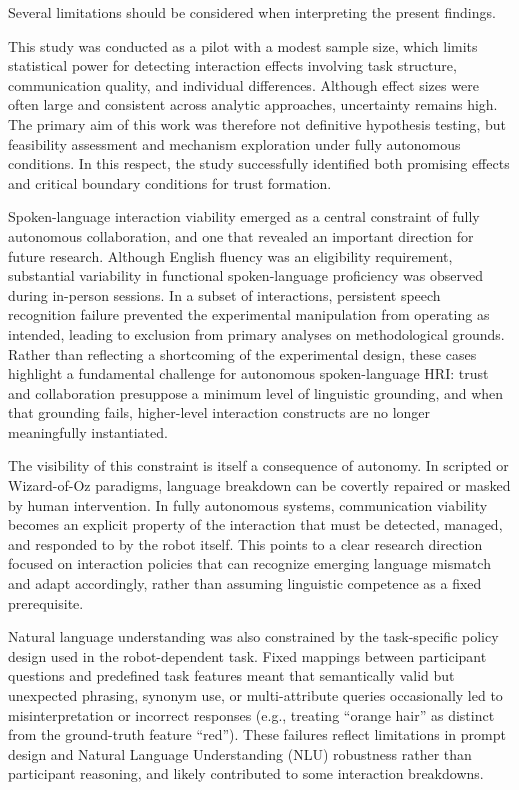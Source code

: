 \documentclass[
  letterpaper,
  DIV=11,
  numbers=noendperiod]{scrartcl}
\begin{document}
Several limitations should be considered when interpreting the present
findings.

This study was conducted as a pilot with a modest sample size, which
limits statistical power for detecting interaction effects involving
task structure, communication quality, and individual differences.
Although effect sizes were often large and consistent across analytic
approaches, uncertainty remains high. The primary aim of this work was
therefore not definitive hypothesis testing, but feasibility assessment
and mechanism exploration under fully autonomous conditions. In this
respect, the study successfully identified both promising effects and
critical boundary conditions for trust formation.

Spoken-language interaction viability emerged as a central constraint of
fully autonomous collaboration, and one that revealed an important
direction for future research. Although English fluency was an
eligibility requirement, substantial variability in functional
spoken-language proficiency was observed during in-person sessions. In a
subset of interactions, persistent speech recognition failure prevented
the experimental manipulation from operating as intended, leading to
exclusion from primary analyses on methodological grounds. Rather than
reflecting a shortcoming of the experimental design, these cases
highlight a fundamental challenge for autonomous spoken-language HRI:
trust and collaboration presuppose a minimum level of linguistic
grounding, and when that grounding fails, higher-level interaction
constructs are no longer meaningfully instantiated.

The visibility of this constraint is itself a consequence of autonomy.
In scripted or Wizard-of-Oz paradigms, language breakdown can be
covertly repaired or masked by human intervention. In fully autonomous
systems, communication viability becomes an explicit property of the
interaction that must be detected, managed, and responded to by the
robot itself. This points to a clear research direction focused on
interaction policies that can recognize emerging language mismatch and
adapt accordingly, rather than assuming linguistic competence as a fixed
prerequisite.

Natural language understanding was also constrained by the task-specific
policy design used in the robot-dependent task. Fixed mappings between
participant questions and predefined task features meant that
semantically valid but unexpected phrasing, synonym use, or
multi-attribute queries occasionally led to misinterpretation or
incorrect responses (e.g., treating ``orange hair'' as distinct from the
ground-truth feature ``red''). These failures reflect limitations in
prompt design and Natural Language Understanding (NLU) robustness rather
than participant reasoning, and likely contributed to some interaction
breakdowns.
\end{document}
